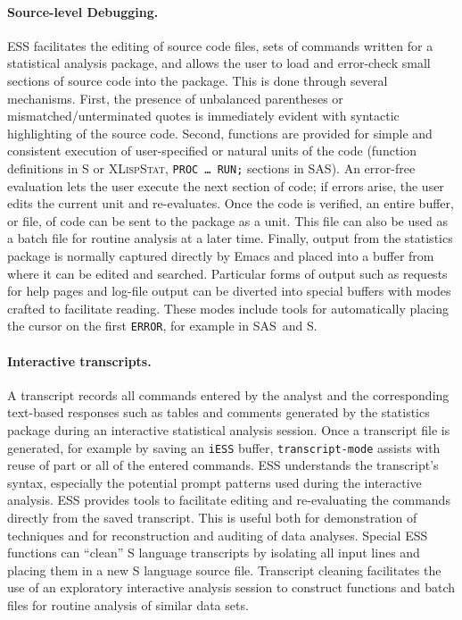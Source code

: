 \documentclass{article}
\newcommand*{\SAS}{\textsc{SAS}}
\newcommand*{\XLispStat}{\textsc{XLispStat}}
\newcommand{\stexttt}[1]{{\small\texttt{#1}}}
\begin{document}
\paragraph{Source-level Debugging.}
ESS facilitates the editing of source code files, sets of commands
written for a statistical analysis package, and allows the user to
load and error-check small sections of source code into the package.
This is done through several mechanisms.  First, the presence of
unbalanced parentheses or mismatched/unterminated quotes is
immediately evident with syntactic highlighting of the source code.
Second, functions are provided for simple and consistent execution of
user-specified or natural units of the code (function definitions in S
or \XLispStat, \stexttt{PROC \dots\ RUN;} sections in \SAS).  An
error-free evaluation lets the user execute the next section of code;
if errors arise, the user edits the current unit and re-evaluates.
Once the code is verified, an entire buffer, or file, of code can be
sent to the package as a unit.  This file can also be used as a batch
file for routine analysis at a later time.  Finally, output from the
statistics package is normally captured directly by Emacs and placed
into a buffer from where it can be edited and searched.  Particular
forms of output such as requests for help pages and log-file output
can be diverted into special buffers with modes crafted to facilitate
reading.  These modes include tools for automatically placing the
cursor on the first \stexttt{ERROR}, for example in \SAS\ and S.

\paragraph{Interactive transcripts.}
A transcript records all commands entered by the analyst and the
corresponding text-based responses such as tables and comments
generated by the statistics package during an interactive statistical
analysis session.  Once a transcript file is generated, for example by
saving an \stexttt{iESS} buffer, \stexttt{transcript-mode} assists
with reuse of part or all of the entered commands.  ESS understands
the transcript's syntax, especially the potential prompt patterns used
during the interactive analysis.  ESS provides tools to facilitate
editing and re-evaluating the commands directly from the saved
transcript.  This is useful both for demonstration of techniques and
for reconstruction and auditing of data analyses.  Special ESS
functions can ``clean'' S language transcripts by isolating all input
lines and placing them in a new S language source file.  Transcript
cleaning facilitates the use of an exploratory interactive analysis
session to construct functions and batch files for routine analysis of
similar data sets.
\end{document}

